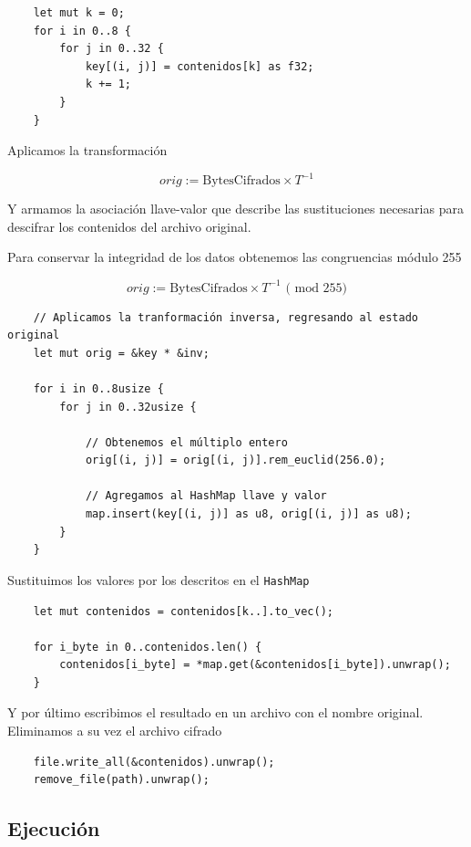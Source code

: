 \documentclass[a4paper]{article}
\begin{document}
\begin{verbatim}
    let mut k = 0;
    for i in 0..8 {
        for j in 0..32 {
            key[(i, j)] = contenidos[k] as f32;
            k += 1;
        }
    }
\end{verbatim}

Aplicamos la transformación

\[
orig := \text{BytesCifrados} \times T^{-1}
\]

Y armamos la asociación llave-valor que describe las sustituciones necesarias
para descifrar los contenidos del archivo original.

Para conservar la integridad de los datos obtenemos las congruencias módulo 255

\[
orig := \text{BytesCifrados} \times T^{-1} \text{ ( mod 255)}
\]

\begin{verbatim}
    // Aplicamos la tranformación inversa, regresando al estado original
    let mut orig = &key * &inv;

    for i in 0..8usize {
        for j in 0..32usize {
        
            // Obtenemos el múltiplo entero
            orig[(i, j)] = orig[(i, j)].rem_euclid(256.0);
            
            // Agregamos al HashMap llave y valor
            map.insert(key[(i, j)] as u8, orig[(i, j)] as u8);
        }
    }
\end{verbatim}

Sustituimos los valores por los descritos en el \texttt{HashMap}

\begin{verbatim}
    let mut contenidos = contenidos[k..].to_vec();

    for i_byte in 0..contenidos.len() {
        contenidos[i_byte] = *map.get(&contenidos[i_byte]).unwrap();
    }
\end{verbatim}

Y por último escribimos el resultado en un archivo con el nombre original.
Eliminamos a su vez el archivo cifrado

\begin{verbatim}
    file.write_all(&contenidos).unwrap();
    remove_file(path).unwrap();
\end{verbatim}

\subsection{Ejecución}
\end{document}
